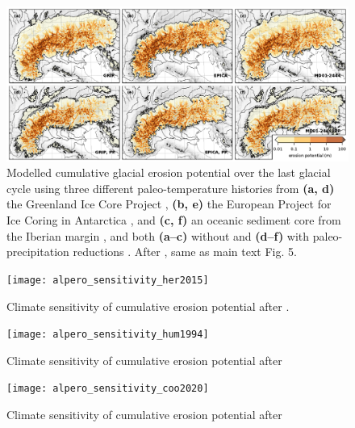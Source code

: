 \documentclass[esurf]{copernicus}
\begin{document}
    \begin{figure}
      \centerline{\includegraphics{alpero_sensitivity}}
      \caption[
        Climate sensitivity of cumulative erosion potential after
        \citet{Koppes.etal.2015}, same as main text Fig. 5.
      ]{%
        Modelled cumulative glacial erosion potential over the last glacial
        cycle using three different paleo-temperature histories from
        \textbf{(a, d)} the Greenland Ice Core Project
        \citep[GRIP;][]{Dansgaard.etal.1993}, \textbf{(b, e)} the European
        Project for Ice Coring in Antarctica \citep[our default,
        EPICA;][]{Jouzel.etal.2007}, and \textbf{(c, f)} an oceanic sediment
        core from the Iberian margin \citep[MD01-2444;][]{Martrat.etal.2007},
        and both \textbf{(a--c)} without and \textbf{(d--f)} with
        paleo-precipitation reductions \citep[cf.][]{Seguinot.etal.2018}.
        After \citet{Koppes.etal.2015}, same as main text Fig. 5.}
    \end{figure}

    \begin{figure}
      \texttt{[image: alpero\_sensitivity\_her2015]}
      \caption{%
        Climate sensitivity of cumulative erosion potential after
        \citet{Herman.etal.2015}.}
    \end{figure}

    \begin{figure}
      \texttt{[image: alpero\_sensitivity\_hum1994]}
      \caption{%
        Climate sensitivity of cumulative erosion potential after
        \citet{Humphrey.Raymond.1994}}
    \end{figure}

    \begin{figure}
      \texttt{[image: alpero\_sensitivity\_coo2020]}
      \caption{%
        Climate sensitivity of cumulative erosion potential after
        \citet{Cook.etal.2020}}
    \end{figure}


\clearpage




\end{document}
